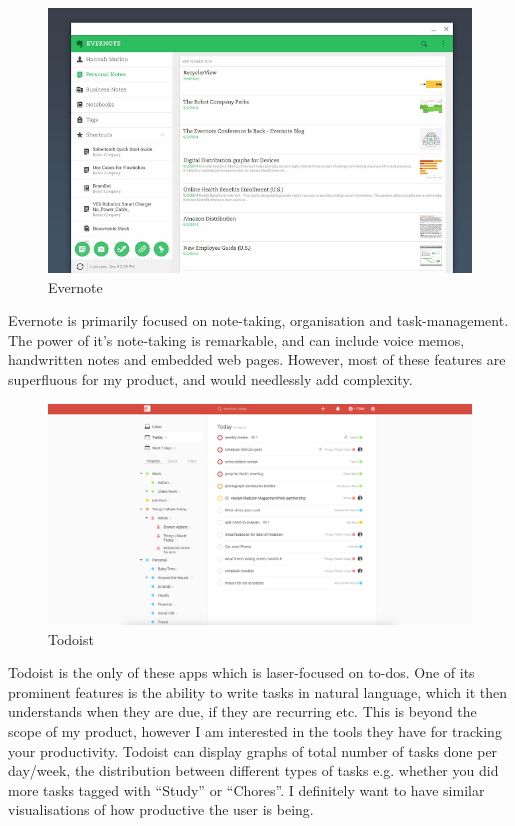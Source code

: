 \documentclass[]{article}
\begin{document}
\begin{figure}
\hypertarget{fig:evernote1}{%
\centering
\includegraphics{./tex2pdf.-ae8b3c0afe160db8/5fe1d1ca864b78d8b632b8b2190688f288849d8a.jpg}
\caption{Evernote{}}\label{fig:evernote1}
}
\end{figure}

Evernote is primarily focused on note-taking, organisation and
task-management. The power of it's note-taking is remarkable, and can
include voice memos, handwritten notes and embedded web pages. However,
most of these features are superfluous for my product, and would
needlessly add complexity.

\begin{figure}
\hypertarget{fig:todoist1}{%
\centering
\includegraphics{./tex2pdf.-ae8b3c0afe160db8/224b4a051a5d597717cc2116efe61fed1d4c815d.png}
\caption{Todoist{}}\label{fig:todoist1}
}
\end{figure}

Todoist is the only of these apps which is laser-focused on to-dos. One
of its prominent features is the ability to write tasks in natural
language, which it then understands when they are due, if they are
recurring etc. This is beyond the scope of my product, however I am
interested in the tools they have for tracking your productivity.
Todoist can display graphs of total number of tasks done per day/week,
the distribution between different types of tasks e.g. whether you did
more tasks tagged with ``Study'' or ``Chores''. I definitely want to
have similar visualisations of how productive the user is being.
\end{document}
